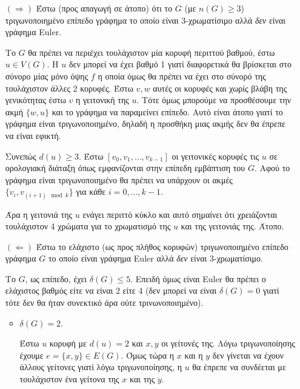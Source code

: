 \documentclass[a4paper, oneside, 11pt]{article}
\theoremstyle{definition}
\begin{document}
\begin{enumerate}
   \begin{itemize}
      \item[$(\Rightarrow)$]
         Έστω (προς απαγωγή σε άτοπο) ότι το $G$ (με $n(G) \geq 3$)
         τριγωνοποιημένο επίπεδο γράφημα το οποίο είναι 3-χρωματίσιμο
         αλλά \emph{δεν} είναι γράφημα Euler.

         Το $G$ θα πρέπει να περιέχει τουλάχιστον μία κορυφή περιττού
         βαθμού, έστω $u \in V(G)$. Η $u$ δεν μπορεί να έχει βαθμό 1
         γιατί διαφορετικά θα βρίσκεται στο σύνορο μίας μόνο
         όψης $f$ η οποία όμως θα πρέπει να έχει στο σύνορό της τουλάχιστον
         άλλες 2 κορυφές. Έστω $v, w$ αυτές οι κορυφές και χωρίς βλάβη της
         γενικότητας έστω $v$ η γειτονική της $u$. Τότε όμως μπορούμε
         να προσθέσουμε την ακμή $\{w, u\}$ και το γράφημα να παραμείνει
         επίπεδο. Αυτό είναι άτοπο γιατί το γράφημα είναι τριγωνοποιημένο,
         δηλαδή η προσθήκη μιας ακμής δεν θα έπρεπε να είναι εφικτή.

         Συνεπώς $d(u) \geq 3$. Έστω $[v_0, v_1, \ldots, v_{k-1}]$
         οι γειτονικές
         κορυφές τις $u$ σε ορολογιακή διάταξη όπως εμφανίζονται στην
         επίπεδη εμβάπτιση του $G$. Αφού το γράφημα είναι τριγωνοποιημένο
         θα πρέπει να υπάρχουν οι ακμές $\{v_i, v_{(i+1) \mod k}\}$ για κάθε
         $i = 0, \ldots, k-1$.

         Άρα η γειτονιά της $u$ ενάγει περιττό κύκλο και αυτό σημαίνει
         ότι χρειάζονται τουλάχιστον 4 χρώματα για το χρωματισμό
         της $u$ και της γειτονιάς της. Άτοπο.

      \item[$(\Leftarrow)$]
         Έστω το ελάχιστο (ως προς πλήθος κορυφών) τριγωνοποιημένο επίπεδο
         γράφημα $G$ το οποίο είναι γράφημα Euler αλλά \emph{δεν} είναι
         3-χρωματίσιμο.%

         Το $G$, ως επίπεδο, έχει $\delta(G) \leq 5$. Επειδή όμως είναι
         Euler θα πρέπει ο ελάχιστος βαθμός είτε να είναι 2 είτε 4 (δεν
         μπορεί να είναι $\delta(G) = 0$ γιατί τότε δεν θα ήταν συνεκτικό
         άρα ούτε τρινωνοποιημένο).

         \begin{itemize}
            \item $\delta(G) = 2$.

            Έστω $u$ κορυφή με $d(u) = 2$ και $x, y$ οι γείτονές της.
            Λόγω τριγωνοποίησης έχουμε $e = \{x, y\} \in E(G)$. Όμως
            τώρα η $x$ και η $y$ δεν γίνεται να έχουν άλλους γείτονες
            γιατί λόγω τριγωνοποίησης, η $u$ θα έπρεπε να συνδέεται
            με τουλάχιστον ένα γείτονα της $x$ και της $y$.


\end{itemize}
\end{itemize}
\end{enumerate}
\end{document}
